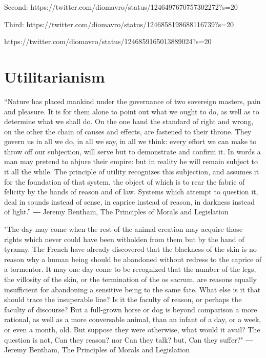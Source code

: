 \documentclass[12pt]{report}
\numberwithin{equation}{section}
\begin{document}
Second: https://twitter.com/diomavro/status/1246497670757302272?s=20



Third: https://twitter.com/diomavro/status/1246858198688116739?s=20

https://twitter.com/diomavro/status/1246859165013889024?s=20

\section{Utilitarianism} 

\begin{tcolorbox}[enhanced,%
  colback=green!25!black!10!white,colframe=green!75!black,title=Principle of utility (10cm),
  drop fuzzy shadow,watermark color=white,watermark text=Fit]
“Nature has placed mankind under the governance of two sovereign masters, pain and pleasure. It is for them alone to point out what we ought to do, as well as to determine what we shall do. On the one hand the standard of right and wrong, on the other the chain of causes and effects, are fastened to their throne. They govern us in all we do, in all we say, in all we think: every effort we can make to throw off our subjection, will serve but to demonstrate and confirm it. In words a man may pretend to abjure their empire: but in reality he will remain subject to it all the while. The principle of utility recognizes this subjection, and assumes it for the foundation of that system, the object of which is to rear the fabric of felicity by the hands of reason and of law. Systems which attempt to question it, deal in sounds instead of sense, in caprice instead of reason, in darkness instead of light.”
― Jeremy Bentham, The Principles of Morals and Legislation
\end{tcolorbox}

\begin{tcolorbox}[enhanced,%
  colback=green!25!black!10!white,colframe=green!75!black,title=Principle of utility (10cm),
  drop fuzzy shadow,watermark color=white,watermark text=Fit]
"The day may come when the rest of the animal creation may acquire those
rights which never could have been witholden from them but by the hand of
tyranny. The French have already discovered that the blackness of the skin
is no reason why a human being should be abandoned without redress to the
caprice of a tormentor. It may one day come to be recognized that the
number of the legs, the villosity of the skin, or the termination of the os
sacrum, are reasons equally insufficient for abandoning a sensitive being to
the same fate. What else is it that should trace the insuperable line? Is it the
faculty of reason, or perhaps the faculty of discourse? But a full-grown
horse or dog is beyond comparison a more rational, as well as a more
conversable animal, than an infant of a day, or a week, or even a month,
old. But suppose they were otherwise, what would it avail? The question is
not, Can they reason? nor Can they talk? but, Can they suffer?"
― Jeremy Bentham, The Principles of Morals and Legislation
\end{tcolorbox}
\end{document}
